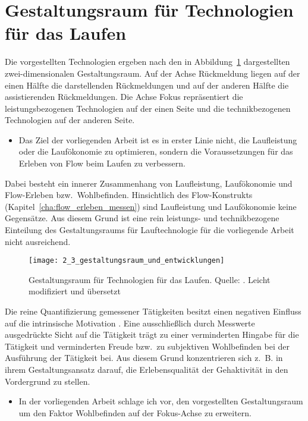 

\section{Gestaltungsraum für Technologien für das Laufen} 

\label{sec:gestaltungsraum_fur_technologien_fur_das_laufen}

Die vorgestellten Technologien ergeben nach \citet[][]{Jensen2014} den in Abbildung~\ref{fig:2_3_gestaltungsraum_und_entwicklungen} dargestellten zwei-dimensionalen Gestaltungsraum. Auf der Achse Rückmeldung liegen auf der einen Hälfte die darstellenden Rückmeldungen und auf der anderen Hälfte die assistierenden Rückmeldungen. Die Achse Fokus repräsentiert die leistungsbezogenen Technologien auf der einen Seite und die technikbezogenen Technologien auf der anderen Seite.
\begin{itemize}
	
	\item Das Ziel der vorliegenden Arbeit ist es in erster Linie nicht, die Laufleistung oder die Laufökonomie zu optimieren, sondern die Voraussetzungen für das Erleben von Flow beim Laufen zu verbessern.
\end{itemize}

Dabei besteht ein innerer Zusammenhang von Laufleistung, Laufökonomie und Flow-Erleben bzw.\ Wohlbefinden. Hinsichtlich des Flow-Konstrukts (Kapitel~\ref{cha:flow_erleben_messen}) sind Laufleistung und Laufökonomie keine Gegensätze. Aus diesem Grund ist eine rein leistungs- und technikbezogene Einteilung des Gestaltungsraums für Lauftechnologie für die vorliegende Arbeit nicht ausreichend.
\begin{figure}
	[t] \centering 
	\texttt{[image: 2\_3\_gestaltungsraum\_und\_entwicklungen]} \caption[Gestaltungsraum für Technologien für das Laufen]{Gestaltungsraum für Technologien für das Laufen. Quelle: \citet[][]{Jensen2014}. Leicht modifiziert und übersetzt}\label{fig:2_3_gestaltungsraum_und_entwicklungen} 
\end{figure}

Die reine Quantifizierung gemessener Tätigkeiten besitzt einen negativen Einfluss auf die intrinsische Motivation \citep[][]{Etkin2016}. Eine ausschließlich durch Messwerte ausgedrückte Sicht auf die Tätigkeit trägt zu einer verminderten Hingabe für die Tätigkeit und verminderten Freude bzw.\ zu subjektiven Wohlbefinden bei der Ausführung der Tätigkeit bei. Aus diesem Grund konzentrieren sich z.~B. \citet{Hajinejad2015} in ihrem Gestaltungsansatz darauf, die Erlebensqualität der Gehaktivität in den Vordergrund zu stellen.
\begin{itemize}
	
	\item In der vorliegenden Arbeit schlage ich vor, den vorgestellten Gestaltungsraum um den Faktor Wohlbefinden auf der Fokus-Achse zu erweitern.
\end{itemize}

